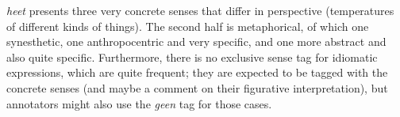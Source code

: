 \documentclass[
]{book}
\begin{document}
\emph{heet} presents three very concrete senses that differ in perspective (temperatures of different kinds of things). The second half is metaphorical, of which one synesthetic, one anthropocentric and very specific, and one more abstract and also quite specific. Furthermore, there is no exclusive sense tag for idiomatic expressions, which are quite frequent; they are expected to be tagged with the concrete senses (and maybe a comment on their figurative interpretation), but annotators might also use the \emph{geen} tag for those cases.

\providecommand{\docline}[3]{\noalign{\global\setlength{\arrayrulewidth}{#1}}\arrayrulecolor[HTML]{#2}\cline{#3}}

\setlength{\tabcolsep}{2pt}

\renewcommand*{\arraystretch}{1.5}
\end{document}
